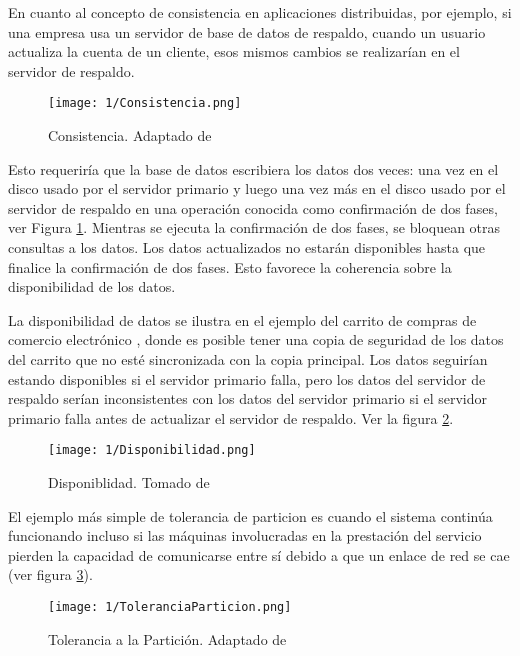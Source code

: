  En cuanto al concepto de \gls{consistencia}  en aplicaciones distribuidas, por ejemplo, si una empresa usa un servidor de base de datos de respaldo, cuando un usuario actualiza la cuenta de un cliente, esos mismos cambios se realizar\'ian en el servidor de respaldo.

\begin{figure} %
	\texttt{[image: 1/Consistencia.png]}
	\caption{Consistencia. Adaptado  de \SU }
	\label{fig:marginCP}
\end{figure}

Esto requeriría que la base de datos escribiera los datos dos veces: una vez en el disco usado por el servidor primario y luego una vez más en el disco usado por el servidor de respaldo en una operación conocida como confirmación de dos fases, ver Figura \ref{fig:marginCP}. 
Mientras se ejecuta la confirmación de dos fases, se bloquean otras consultas a los datos. Los datos actualizados no estarán disponibles hasta que finalice la confirmación de dos fases. Esto favorece la coherencia sobre la disponibilidad de los datos.


La \gls{disponibilidad} de datos se ilustra en el ejemplo del carrito de compras de comercio electr\'onico , 
donde es posible tener una copia de seguridad de los datos del carrito que no est\'e sincronizada con la copia principal. Los datos seguir\'ian estando disponibles si el servidor primario falla, pero los datos del servidor de respaldo ser\'ian inconsistentes con los datos del servidor primario si el servidor primario falla antes de actualizar el servidor de respaldo.  Ver la figura \ref{fig:marginAP}.


\begin{figure}%
	\texttt{[image: 1/Disponibilidad.png]}
	\caption{Disponiblidad. Tomado de \SU }
	\label{fig:marginAP}
\end{figure}

El ejemplo m\'as simple de \gls{tolerancia de particion} es cuando el sistema continúa funcionando incluso si las máquinas involucradas en la prestación del servicio pierden la capacidad de comunicarse entre sí debido a que un enlace de red se cae (ver  figura \ref{fig:marginToleranciaParticion}).

\begin{figure}[H]%
	\texttt{[image: 1/ToleranciaParticion.png]}
	\caption{Tolerancia a la Partici\'on. Adaptado de \LI }
	\label{fig:marginToleranciaParticion}
\end{figure}
 
